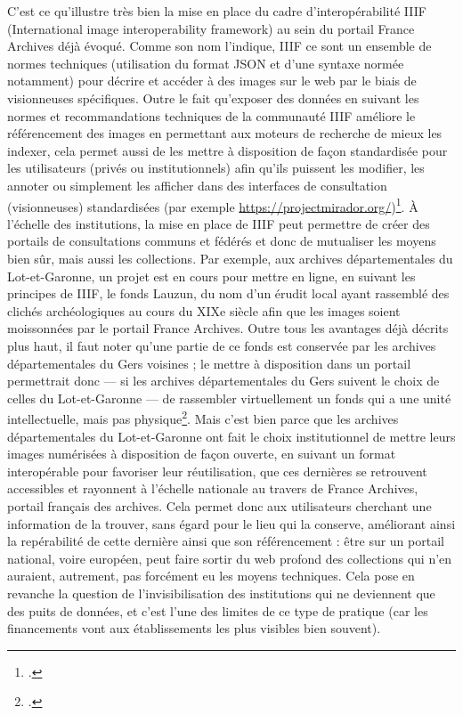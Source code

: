 C’est ce qu’illustre très bien la mise en place du cadre d’interopérabilité IIIF (International image interoperability framework) au sein du portail France Archives déjà évoqué. Comme son nom l’indique, IIIF ce sont un ensemble de normes techniques (utilisation du format JSON et d’une syntaxe normée notamment) pour décrire et accéder à des images sur le web par le biais de visionneuses spécifiques. Outre le fait qu’exposer des données en suivant les normes et recommandations techniques de la communauté IIIF améliore le référencement des images en permettant aux moteurs de recherche de mieux les indexer, cela permet aussi de les mettre à disposition de façon standardisée pour les utilisateurs (privés ou institutionnels) afin qu’ils puissent les modifier, les annoter ou simplement les afficher dans des interfaces de consultation (visionneuses) standardisées (par exemple \url{https://projectmirador.org/})\footcite{robineau_programme_2023}. À l’échelle des institutions, la mise en place de IIIF peut permettre de créer des portails de consultations communs et fédérés et donc de mutualiser les moyens bien sûr, mais aussi les collections. Par exemple, aux archives départementales du Lot-et-Garonne, un projet est en cours pour mettre en ligne, en suivant les principes de IIIF, le fonds Lauzun, du nom d’un érudit local ayant rassemblé des clichés archéologiques au cours du XIXe siècle afin que les images soient moissonnées par le portail France Archives. Outre tous les avantages déjà décrits plus haut, il faut noter qu’une partie de ce fonds est conservée par les archives départementales du Gers voisines ; le mettre à disposition dans un portail permettrait donc — si les archives départementales du Gers suivent le choix de celles du Lot-et-Garonne — de rassembler virtuellement un fonds qui a une unité intellectuelle, mais pas physique\footcite{brunet_archives_2023}. Mais c’est bien parce que les archives départementales du Lot-et-Garonne ont fait le choix institutionnel de mettre leurs images numérisées à disposition de façon ouverte, en suivant un format interopérable pour favoriser leur réutilisation, que ces dernières se retrouvent accessibles et rayonnent à l’échelle nationale au travers de France Archives, portail français des archives. Cela permet donc aux utilisateurs cherchant une information de la trouver, sans égard pour le lieu qui la conserve, améliorant ainsi la repérabilité de cette dernière ainsi que son référencement : être sur un portail national, voire européen, peut faire sortir du web profond des collections qui n’en auraient, autrement, pas forcément eu les moyens techniques. Cela pose en revanche la question de l’invisibilisation des institutions qui ne deviennent que des puits de données, et c’est l’une des limites de ce type de pratique (car les financements vont aux établissements les plus visibles bien souvent).

